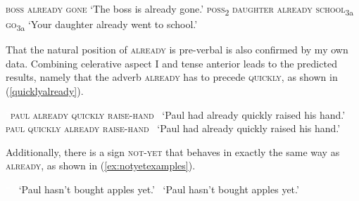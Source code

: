 \begin{exe}
\ex\label{papasssssalready}\begin{xlist} 
\ex \textsc{boss already gone} 
\glt `The boss is already gone.' \label{alreadygonepapaa}
\ex \textsc{poss}\textsubscript{2} \textsc{daughter already school}\textsubscript{3a} \textsc{go}\textsubscript{3a}
\glt `Your daughter already went to school.' \label{alreadygonepapaa}
\end{xlist}
\end{exe} 

\noindent That the natural position of \textsc{already} is pre-verbal is also confirmed by my own data. Combining celerative aspect I and tense anterior leads to the predicted results, namely that the adverb \textsc{already} has to precede \textsc{quickly}, as shown in (\ref{quicklyalready}).

\begin{exe}
\ex\label{quicklyalready}\begin{xlist} 
\ex \textcolor{white}{*}\textsc{paul already quickly raise-hand} \label{quicklyalreadya}
\glt \textcolor{white}{*}`Paul had already quickly raised his hand.'
\ex *\textsc{paul quickly already raise-hand}
\glt \textcolor{white}{*}`Paul had already quickly raised his hand.'\label{quicklyalreadyb}
\end{xlist}
\end{exe} 

\noindent Additionally, there is a sign \textsc{not-yet} that behaves in exactly the same way as \textsc{already}, as shown in (\ref{ex:notyetexamples}).

\begin{exe}
\ex\label{ex:notyetexamples}\begin{xlist} 
\ex \textcolor{white}{*}  
\glt \textcolor{white}{*}`Paul hasn't bought apples yet.' \label{ex:notyetexamplesa}
\ex *  
\glt \textcolor{white}{*}`Paul hasn't bought apples yet.' \label{ex:notyetexamplesb}

\end{xlist}
\end{exe}

